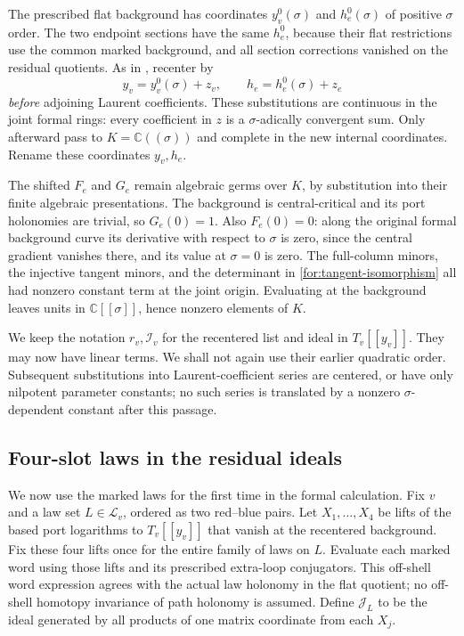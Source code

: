 The prescribed flat background has coordinates
$y_v^0(\sigma)$ and $h_e^0(\sigma)$ of positive $\sigma$ order.
The two endpoint sections have the same $h_e^0$, because their flat
restrictions use the common marked background, and all section
corrections vanished on the residual quotients.  As in
\cite[Section~6.5]{MT}, recenter by
\[
 y_v=y_v^0(\sigma)+z_v,\qquad h_e=h_e^0(\sigma)+z_e
\]
\emph{before} adjoining Laurent coefficients.  These substitutions
are continuous in the joint formal rings: every coefficient in $z$
is a $\sigma$-adically convergent sum.  Only afterward pass to
$K=\mathbb C((\sigma))$ and complete in the new internal coordinates.
Rename these coordinates $y_v,h_e$.

The shifted $F_e$ and $G_e$ remain algebraic germs over $K$, by
substitution into their finite algebraic presentations.  The
background is central-critical and its port holonomies are trivial,
so $G_e(0)=1$.  Also $F_e(0)=0$: along the original formal background
curve its derivative with respect to $\sigma$ is zero, since the
central gradient vanishes there, and its value at $\sigma=0$ is zero.
The full-column minors, the injective tangent minors, and the
determinant in \eqref{for:tangent-isomorphism} all had nonzero constant
term at the joint origin.  Evaluating at the background leaves units
in $\mathbb C[[\sigma]]$, hence nonzero elements of $K$.

We keep the notation $r_v,\mathcal I_v$ for the recentered list and
ideal in $T_v[[y_v]]$.  They may now have linear terms.  We shall not
again use their earlier quadratic order.  Subsequent substitutions
into Laurent-coefficient series are centered, or have only nilpotent
parameter constants; no such series is translated by a nonzero
$\sigma$-dependent constant after this passage.

\subsection{Four-slot laws in the residual ideals}

We now use the marked laws for the first time in the formal
calculation.  Fix $v$ and a law set $L\in\mathcal L_v$, ordered as
two red--blue pairs.  Let $X_1,\ldots,X_4$ be lifts of the based
port logarithms to $T_v[[y_v]]$ that vanish at the recentered
background.  Fix these four lifts once for the entire family of laws
on $L$.  Evaluate each marked word using those lifts and its prescribed
extra-loop conjugators.  This off-shell word expression agrees with
the actual law holonomy in the flat quotient; no off-shell homotopy
invariance of path holonomy is assumed.  Define $\mathcal J_L$ to be
the ideal generated by all
products of one matrix coordinate from each $X_j$.

